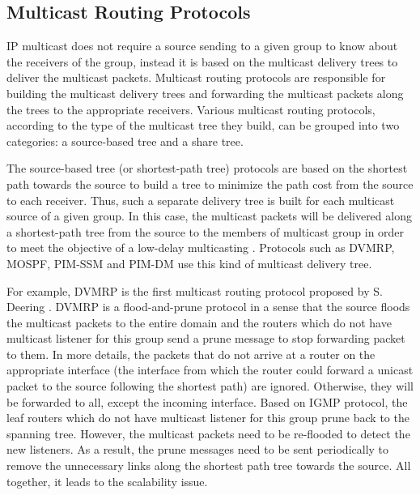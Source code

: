 \subsection{Multicast Routing Protocols}
IP multicast does not require a source sending to a given group to know about the receivers of the group, instead it is based on the multicast delivery trees to deliver the multicast packets. Multicast routing protocols are responsible for building the multicast delivery trees and forwarding the multicast packets along the trees to the appropriate receivers. Various multicast routing protocols, according to the type of the multicast tree they build, can be grouped into two categories: a source-based tree and a share tree. 

The source-based tree (or shortest-path tree) protocols are based on the shortest path towards the source to build a tree to minimize the path cost from the source to each receiver. Thus, such a separate delivery tree is built for each multicast source of a given group. In this case, the multicast packets will be delivered along a shortest-path tree from the source to the members of multicast group in order to meet the objective of a low-delay multicasting \cite{Deering_88}. Protocols such as DVMRP, MOSPF, PIM-SSM and PIM-DM use this kind of multicast delivery tree. 

For example, DVMRP is the first multicast routing protocol proposed by S. Deering \cite{Deering_88}. DVMRP is a flood-and-prune protocol in a sense that the source floods the multicast packets to the entire domain and the routers which do not have multicast listener for this group send a prune message to stop forwarding packet to them. In more details, the packets that do not arrive at a router on the appropriate interface (the interface from which the router could forward a unicast packet to the source following the shortest path) are ignored. Otherwise, they will be forwarded to all, except the incoming interface. Based on IGMP protocol, the leaf routers which do not have multicast listener for this group prune back to the spanning tree. However, the multicast packets need to be re-flooded to detect the new listeners. As a result, the prune messages need to be sent periodically to remove the unnecessary links along the shortest path tree towards the source. All together, it leads to the scalability issue.  

